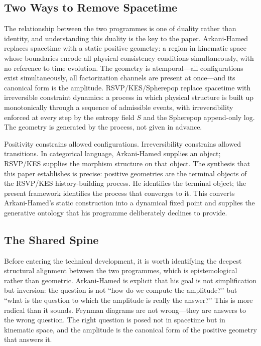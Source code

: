 \documentclass[12pt, oneside]{amsart}
\theoremstyle{plain}
\theoremstyle{definition}
\theoremstyle{remark}
\newcommand{\Sf}{S}
\begin{document}
\subsection{Two Ways to Remove Spacetime}

The relationship between the two programmes is one of duality rather than identity, and understanding this duality is the key to the paper. Arkani-Hamed replaces spacetime with a static positive geometry: a region in kinematic space whose boundaries encode all physical consistency conditions simultaneously, with no reference to time evolution. The geometry is atemporal---all configurations exist simultaneously, all factorization channels are present at once---and its canonical form is the amplitude. RSVP/KES/Spherepop replace spacetime with irreversible constraint dynamics: a process in which physical structure is built up monotonically through a sequence of admissible events, with irreversibility enforced at every step by the entropy field $\Sf$ and the Spherepop append-only log. The geometry is generated by the process, not given in advance.

Positivity constrains allowed configurations. Irreversibility constrains allowed transitions. In categorical language, Arkani-Hamed supplies an object; RSVP/KES supplies the morphism structure on that object. The synthesis that this paper establishes is precise: positive geometries are the terminal objects of the RSVP/KES history-building process. He identifies the terminal object; the present framework identifies the process that converges to it. This converts Arkani-Hamed's static construction into a dynamical fixed point and supplies the generative ontology that his programme deliberately declines to provide.

\subsection{The Shared Spine}

Before entering the technical development, it is worth identifying the deepest structural alignment between the two programmes, which is epistemological rather than geometric. Arkani-Hamed is explicit that his goal is not simplification but inversion: the question is not ``how do we compute the amplitude?'' but ``what is the question to which the amplitude is really the answer?'' This is more radical than it sounds. Feynman diagrams are not wrong---they are answers to the wrong question. The right question is posed not in spacetime but in kinematic space, and the amplitude is the canonical form of the positive geometry that answers it.
\end{document}
